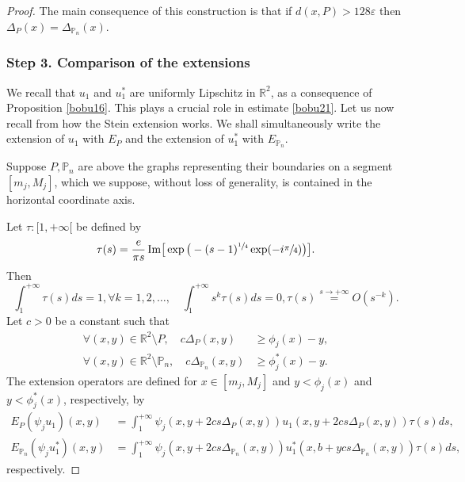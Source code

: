 \documentclass[JEP,XML,SOM,Unicode,ThmDefs,NoFloatCountersInSection,published]{cedram}
\theoremstyle{plain}
\theoremstyle{definition}
\let\Bbb\mathbb
\def\R{\mathbb{R}}
\newcommand{\vps}{\varepsilon}
\begin{document}
\begin{proof}
The main consequence of this construction is that if $d(x, P) > 128 \vps$ then $\Delta_P(x) =\Delta_{\Bbb P_n}(x)$.

\subsubsection*{Step 3. Comparison of the extensions} We recall that $u_1$ and $u_1^*$ are uniformly Lipschitz in $\R^2$, as a consequence of Proposition \ref{bobu16}. This plays a crucial role in estimate \eqref{bobu21}. Let us now recall from \cite{St70} how the Stein extension works. We shall simultaneously write the extension of $u_1$ with $E_P$ and the extension of $u_1^*$ with $E_{\Bbb P_n}$.

Suppose $P, \Bbb P_n$ are above the graphs representing their boundaries on a segment $[m_j,M_j]$, which we suppose, without loss of generality, is contained in the horizontal coordinate axis.

Let $\tau :[1, +\infty[$ be defined by
\[
\tau (s)= \frac{e}{\pi s}\, \text{Im} \big [ \exp \big (-(s-1)^{\sfrac 14} \exp (-i \sfrac{\pi}{4})\big) \big ].
\]
Then
\[
\int_1^{+\infty} \tau (s) ds =1, \forall k=1, 2,\dots,\quad \int_1^{+\infty} s^k \tau (s) ds =0, \tau (s) \stackrel{s \rightarrow +\infty}{=} O(s^{-k}).
\]
Let $c>0$ be a constant such that
\begin{align*}
\forall (x,y) \in \R^2 \setminus P, \quad c \Delta_P (x,y) &\ge \phi_j (x) -y,
\\
\forall (x,y) \in \R^2 \setminus \Bbb P_n, \quad c \Delta_{\Bbb P_n} (x,y) &\ge \phi^*_j (x) -y.
\end{align*}
The extension operators are defined for $x \in [m_j,M_j]$ and $ y <\phi_j (x)$ and $ y < \phi_j^*(x)$, respectively, by
\begin{align*}
E_P(\psi_j u_1)(x,y)&= \int_1^{+\infty} \psi_j(x, y+2 cs \Delta_P(x,y)) u_1(x, y+2 cs \Delta_P(x,y))\tau (s) ds,
\\
E_{\Bbb P_n}(\psi_j u^*_1)(x,y)&= \int_1^{+\infty} \psi_j (x, y+2 cs \Delta_{\Bbb P_n}(x,y)) u_1^*(x, b+y cs \Delta_{\Bbb P_n}(x,y))\tau (s) ds,
\end{align*}
respectively.


\end{proof}
\end{document}
